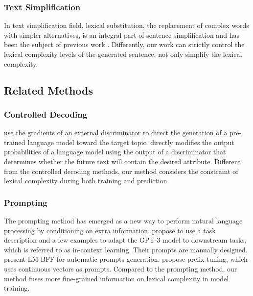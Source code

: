 \documentclass[11pt]{article}
\begin{document}
\subsubsection{Text Simplification}
In text simplification field, lexical substitution, the replacement of complex words with simpler alternatives, is an integral part of sentence simplification and has been the subject of previous work \cite{alonzo2020automatic, nishihara2019controllable}. Differently, our work can strictly control the lexical complexity levels of the generated sentence, not only simplify the lexical complexity.

\subsection{Related Methods}
\subsubsection{Controlled Decoding}
\citet{dathathri2019plug} use the gradients of an external discriminator to direct the generation of a pre-trained language model toward the target topic.  \citet{yang2021fudge} directly modifies the output probabilities of a language model using the output of a discriminator that determines whether the future text will contain the desired attribute. Different from the controlled decoding methods, our method considers the constraint of lexical complexity during both training and prediction.


\subsubsection{Prompting}
The prompting method has emerged as a new way to perform natural language processing by conditioning on extra information.
\citet{brown2020language} propose to use a task description and a few examples to adapt the GPT-3 model to downstream tasks, which is referred to as in-context learning. Their prompts are manually designed. \citet{gao2020making} present LM-BFF for automatic prompts generation. \citet{liang2021prefix} propose prefix-tuning, which uses continuous vectors as prompts. Compared to the prompting method, our method fuses more fine-grained information on lexical complexity in model training.
\end{document}
